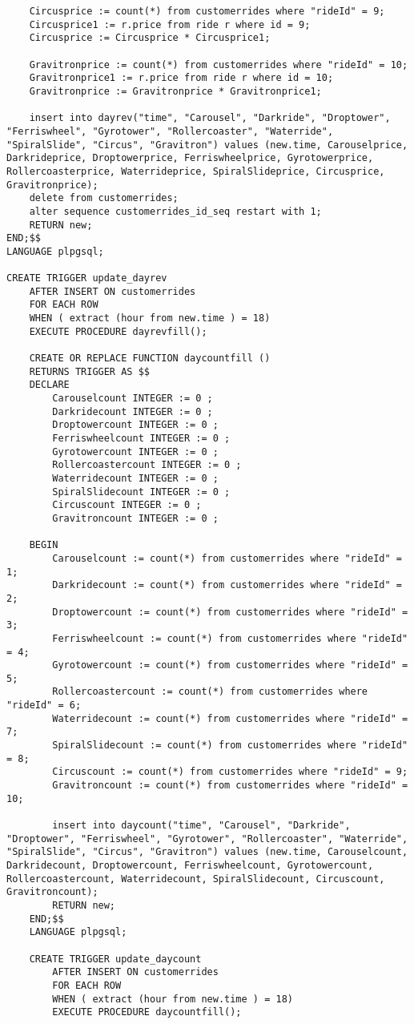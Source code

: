 \begin{lstlisting}
    Circusprice := count(*) from customerrides where "rideId" = 9;
    Circusprice1 := r.price from ride r where id = 9;
    Circusprice := Circusprice * Circusprice1;

    Gravitronprice := count(*) from customerrides where "rideId" = 10;
    Gravitronprice1 := r.price from ride r where id = 10;
    Gravitronprice := Gravitronprice * Gravitronprice1;

    insert into dayrev("time", "Carousel", "Darkride", "Droptower", "Ferriswheel", "Gyrotower", "Rollercoaster", "Waterride", "SpiralSlide", "Circus", "Gravitron") values (new.time, Carouselprice, Darkrideprice, Droptowerprice, Ferriswheelprice, Gyrotowerprice, Rollercoasterprice, Waterrideprice, SpiralSlideprice, Circusprice, Gravitronprice);
    delete from customerrides;
    alter sequence customerrides_id_seq restart with 1;
    RETURN new;
END;$$
LANGUAGE plpgsql;

CREATE TRIGGER update_dayrev
    AFTER INSERT ON customerrides
    FOR EACH ROW
    WHEN ( extract (hour from new.time ) = 18)
    EXECUTE PROCEDURE dayrevfill();

    CREATE OR REPLACE FUNCTION daycountfill ()
    RETURNS TRIGGER AS $$
    DECLARE
        Carouselcount INTEGER := 0 ;
        Darkridecount INTEGER := 0 ;
        Droptowercount INTEGER := 0 ;
        Ferriswheelcount INTEGER := 0 ;
        Gyrotowercount INTEGER := 0 ;
        Rollercoastercount INTEGER := 0 ;
        Waterridecount INTEGER := 0 ;
        SpiralSlidecount INTEGER := 0 ;
        Circuscount INTEGER := 0 ;
        Gravitroncount INTEGER := 0 ;

    BEGIN
        Carouselcount := count(*) from customerrides where "rideId" = 1;
        Darkridecount := count(*) from customerrides where "rideId" = 2;
        Droptowercount := count(*) from customerrides where "rideId" = 3;
        Ferriswheelcount := count(*) from customerrides where "rideId" = 4;
        Gyrotowercount := count(*) from customerrides where "rideId" = 5;
        Rollercoastercount := count(*) from customerrides where "rideId" = 6;
        Waterridecount := count(*) from customerrides where "rideId" = 7;
        SpiralSlidecount := count(*) from customerrides where "rideId" = 8;
        Circuscount := count(*) from customerrides where "rideId" = 9;
        Gravitroncount := count(*) from customerrides where "rideId" = 10;

        insert into daycount("time", "Carousel", "Darkride", "Droptower", "Ferriswheel", "Gyrotower", "Rollercoaster", "Waterride", "SpiralSlide", "Circus", "Gravitron") values (new.time, Carouselcount, Darkridecount, Droptowercount, Ferriswheelcount, Gyrotowercount, Rollercoastercount, Waterridecount, SpiralSlidecount, Circuscount, Gravitroncount);
        RETURN new;
    END;$$
    LANGUAGE plpgsql;

    CREATE TRIGGER update_daycount
        AFTER INSERT ON customerrides
        FOR EACH ROW
        WHEN ( extract (hour from new.time ) = 18)
        EXECUTE PROCEDURE daycountfill();
\end{lstlisting}

